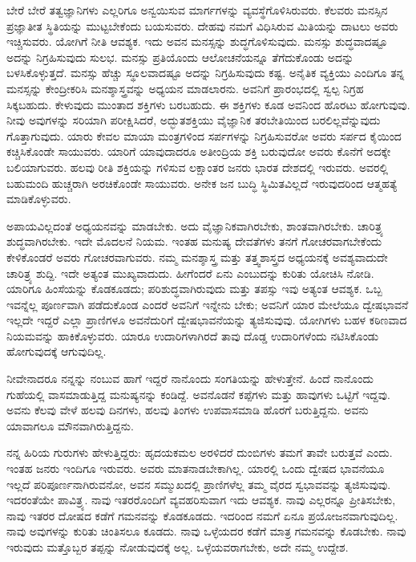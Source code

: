 ಬೇರೆ ಬೇರೆ ತತ್ವಜ್ಞಾನಿಗಳು ಎಲ್ಲರಿಗೂ ಅನ್ವಯಿಸುವ ಮಾರ್ಗಗಳನ್ನು ವ್ಯವಸ್ಥೆಗೊಳಿಸಿರುವರು. ಕೆಲವರು ಮನಸ್ಸಿನ ಪ್ರಜ್ಞಾತೀತ ಸ್ಥಿತಿಯನ್ನು ಮುಟ್ಟಬೇಕೆಂದು ಬಯಸುವರು. ದೇಹವು ನಮಗೆ ವಿಧಿಸಿರುವ ಮಿತಿಯನ್ನು ದಾಟಲು ಅವರು ಇಚ್ಚಿಸುವರು. ಯೋಗಿಗೆ ನೀತಿ ಆವಶ್ಯಕ. ಇದು ಅವನ ಮನಸ್ಸನ್ನು ಶುದ್ಧಗೊಳಿಸುವುದು. ಮನಸ್ಸು ಶುದ್ಧವಾದಷ್ಟೂ ಅದನ್ನು ನಿಗ್ರಹಿಸುವುದು ಸುಲಭ. ಮನಸ್ಸು ಪ್ರತಿಯೊಂದು ಆಲೋಚನೆಯನ್ನೂ ತೆಗೆದುಕೊಂಡು ಅದನ್ನು ಬಳಸಿಕೊಳ್ಳುತ್ತದೆ. ಮನಸ್ಸು ಹೆಚ್ಚು ಸ್ಥೂಲವಾದಷ್ಟೂ ಅದನ್ನು ನಿಗ್ರಹಿಸುವುದು ಕಷ್ಟ. ಅನೈತಿಕ ವ್ಯಕ್ತಿಯು ಎಂದಿಗೂ ತನ್ನ ಮನಸ್ಸನ್ನು ಕೇಂದ್ರೀಕರಿಸಿ ಮನಶ್ಶಾಸ್ತ್ರವನ್ನು ಅಧ್ಯಯನ ಮಾಡಲಾರನು. ಅವನಿಗೆ ಪ್ರಾರಂಭದಲ್ಲಿ ಸ್ವಲ್ಪ ನಿಗ್ರಹ ಸಿಕ್ಕಬಹುದು. ಕೇಳುವುದು ಮುಂತಾದ ಶಕ್ತಿಗಳು ಬರಬಹುದು. ಈ ಶಕ್ತಿಗಳು ಕೂಡ ಅವನಿಂದ ಹೊರಟು ಹೋಗುವುವು. ನೀವು ಅವುಗಳನ್ನು ಸರಿಯಾಗಿ ಪರೀಕ್ಷಿಸಿದರೆ, ಅದ್ಭುತಶಕ್ತಿಯು ವೈಜ್ಞಾನಿಕ ತರಬೇತಿಯಿಂದ ಬರಲಿಲ್ಲವೆನ್ನುವುದು ಗೊತ್ತಾಗುವುದು. ಯಾರು ಕೇವಲ ಮಾಯಾ ಮಂತ್ರಗಳಿಂದ ಸರ್ಪಗಳನ್ನು ನಿಗ್ರಹಿಸುವರೋ ಅವರು ಸರ್ಪದ ಕೈಯಿಂದ ಕಚ್ಚಿಸಿಕೊಂಡೇ ಸಾಯುವರು. ಯಾರಿಗೆ ಯಾವುದಾದರೂ ಅತೀಂದ್ರಿಯ ಶಕ್ತಿ ಬರುವುದೋ ಅವರು ಕೊನೆಗೆ ಅದಕ್ಕೇ ಬಲಿಯಾಗುವರು. ಹಲವು ರೀತಿ ಶಕ್ತಿಯನ್ನು ಗಳಿಸುವ ಲಕ್ಷಾಂತರ ಜನರು ಭಾರತ ದೇಶದಲ್ಲಿ ಇರುವರು. ಅವರಲ್ಲಿ ಬಹುಮಂದಿ ಹುಚ್ಚರಾಗಿ ಅರಚಿಕೊಂಡೇ ಸಾಯುವರು. ಅನೇಕ ಜನ ಬುದ್ಧಿ ಸ್ಥಿಮಿತವಿಲ್ಲದೆ ಇರುವುದರಿಂದ ಆತ್ಮಹತ್ಯೆ ಮಾಡಿಕೊಳ್ಳುವರು.

ಅಪಾಯವಿಲ್ಲದಂತೆ ಅಧ್ಯಯನವನ್ನು ಮಾಡಬೇಕು. ಅದು ವೈಜ್ಞಾನಿಕವಾಗಿರಬೇಕು, ಶಾಂತವಾಗಿರಬೇಕು. ಚಾರಿತ್ರ್ಯ ಶುದ್ಧವಾಗಿರಬೇಕು. ಇದೇ ಮೊದಲನೆ ನಿಯಮ. ಇಂತಹ ಮನುಷ್ಯ ದೇವತೆಗಳು ತನಗೆ ಗೋಚರವಾಗಬೇಕೆಂದು ಕೇಳಿಕೊಂಡರೆ ಅವರು ಗೋಚರವಾಗುವರು. ನಮ್ಮ ಮನಶ್ಶಾಸ್ತ್ರ ಮತ್ತು ತತ್ತ್ವಶಾಸ್ತ್ರದ ಅಧ್ಯಯನಕ್ಕೆ ಅವಶ್ಯವಾದುದೇ ಚಾರಿತ್ರ್ಯ ಶುದ್ದಿ. ಇದೇ ಅತ್ಯಂತ ಮುಖ್ಯವಾದುದು. ಹೀಗೆಂದರೆ ಏನು ಎಂಬುದನ್ನು ಕುರಿತು ಯೋಚಿಸಿ ನೋಡಿ. ಯಾರಿಗೂ ಹಿಂಸೆಯನ್ನು ಕೊಡಕೂಡದು; ಪರಿಶುದ್ಧವಾಗಿರುವುದು ಮತ್ತು ತಪಸ್ಸು ಇವು ಅತ್ಯಂತ ಆವಶ್ಯಕ. ಒಬ್ಬ ಇವನ್ನೆಲ್ಲ ಪೂರ್ಣವಾಗಿ ಪಡೆದುಕೊಂಡ ಎಂದರೆ ಅವನಿಗೆ ಇನ್ನೇನು ಬೇಕು; ಅವನಿಗೆ ಯಾರ ಮೇಲೆಯೂ ದ್ವೇಷಭಾವನೆ ಇಲ್ಲದೇ ಇದ್ದರೆ ಎಲ್ಲಾ ಪ್ರಾಣಿಗಳೂ ಅವನೆದುರಿಗೆ ದ್ವೇಷಭಾವನೆಯನ್ನು ತ್ಯಜಿಸುವುವು. ಯೋಗಿಗಳು ಬಹಳ ಕಠಿಣವಾದ ನಿಯಮವನ್ನು ಹಾಕಿಕೊಳ್ಳುವರು. ಯಾರೂ ಉದಾರಿಗಳಾಗಿರದೆ ತಾವು ದೊಡ್ಡ ಉದಾರಿಗಳೆಂದು ನಟಿಸಿಕೊಂಡು ಹೋಗುವುದಕ್ಕೆ ಆಗುವುದಿಲ್ಲ.

ನೀವೇನಾದರೂ ನನ್ನನ್ನು ನಂಬುವ ಹಾಗೆ ಇದ್ದರೆ ನಾನೊಂದು ಸಂಗತಿಯನ್ನು ಹೇಳುತ್ತೇನೆ. ಹಿಂದೆ ನಾನೊಂದು ಗುಹೆಯಲ್ಲಿ ವಾಸಮಾಡುತ್ತಿದ್ದ ಮನುಷ್ಯನನ್ನು ಕಂಡಿದ್ದೆ. ಅವನೊಡನೆ ಕಪ್ಪೆಗಳು ಮತ್ತು ಹಾವುಗಳು ಒಟ್ಟಿಗೆ ಇದ್ದವು. ಅವನು ಕೆಲವು ವೇಳೆ ಹಲವು ದಿನಗಳು, ಹಲವು ತಿಂಗಳು ಉಪವಾಸಮಾಡಿ ಹೊರಗೆ ಬರುತ್ತಿದ್ದನು. ಅವನು ಯಾವಾಗಲೂ ಮೌನವಾಗಿರುತ್ತಿದ್ದನು.

ನನ್ನ ಹಿರಿಯ ಗುರುಗಳು ಹೇಳುತ್ತಿದ್ದರು: ಹೃದಯಕಮಲ ಅರಳಿದರೆ ದುಂಬಿಗಳು ತಮಗೆ ತಾವೇ ಬರುತ್ತವೆ ಎಂದು. ಇಂತಹ ಜನರು ಇಂದಿಗೂ ಇರುವರು. ಅವರು ಮಾತನಾಡಬೇಕಾಗಿಲ್ಲ. ಯಾರಲ್ಲಿ ಒಂದು ದ್ವೇಷದ ಭಾವನೆಯೂ ಇಲ್ಲದೆ ಪರಿಪೂರ್ಣನಾಗಿರುವನೋ, ಅವನ ಸಮ್ಮುಖದಲ್ಲಿ ಪ್ರಾಣಿಗಳೆಲ್ಲ ತಮ್ಮ ವೈರದ ಸ್ವಭಾವವನ್ನು ತ್ಯಜಿಸುವುವು. ಇದರಂತೆಯೇ ಪಾವಿತ್ರ್ಯ. ನಾವು ಇತರರೊಂದಿಗೆ ವ್ಯವಹರಿಸುವಾಗ ಇದು ಆವಶ್ಯಕ. ನಾವು ಎಲ್ಲರನ್ನೂ ಪ್ರೀತಿಸಬೇಕು, ನಾವು ಇತರರ ದೋಷದ ಕಡೆಗೆ ಗಮನವನ್ನು ಕೊಡಕೂಡದು. ಇದರಿಂದ ನಮಗೆ ಏನೂ ಪ್ರಯೋಜನವಾಗುವುದಿಲ್ಲ. ನಾವು ಅವುಗಳನ್ನು ಕುರಿತು ಚಿಂತಿಸಲೂ ಕೂಡದು. ನಾವು ಒಳ್ಳೆಯದರ ಕಡೆಗೆ ಮಾತ್ರ ಗಮನವನ್ನು ಕೊಡಬೇಕು. ನಾವು ಇರುವುದು ಮತ್ತೊಬ್ಬರ ತಪ್ಪನ್ನು ನೋಡುವುದಕ್ಕೆ ಅಲ್ಲ. ಒಳ್ಳೆಯವರಾಗಬೇಕು, ಅದೇ ನಮ್ಮ ಉದ್ದೇಶ.

